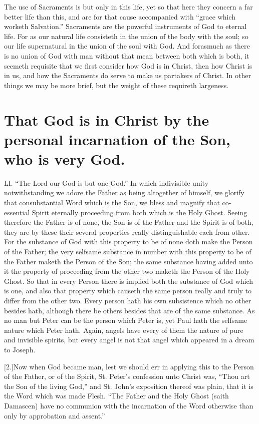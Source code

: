 The use of Sacraments is but only in this life, yet so that here they concern a far better life than this, and are for that cause accompanied with “grace which worketh Salvation.” Sacraments are the powerful instruments of God to eternal life. For as our natural life consisteth in the union of the body with the soul; so our life supernatural in the union of the soul with God. And forasmuch as there is no union of God with man without that mean between both which is both, it seemeth requisite that we first consider how God is in Christ, then how Christ is in us, and how the Sacraments do serve to make us partakers of Christ. In other things we may be more brief, but the weight of these requireth largeness.


\section*{That God is in Christ by the personal incarnation of the Son, who is very God.}
LI. “The Lord our God is but one God.” In which indivisible unity notwithstanding we adore the Father as being altogether of himself, we glorify that consubstantial Word which is the Son, we bless and magnify that co-essential Spirit eternally proceeding from both which is the Holy Ghost. Seeing therefore the Father is of none, the Son is of the Father and the Spirit is of both, they are by these their several properties really distinguishable each from other. For the substance of God with this property to be of none doth make the Person of the Father; the very selfsame substance in number with this property to be of the Father maketh the Person of the Son; the same substance having added unto it the property of proceeding from the other two maketh the Person of the Holy Ghost. So that in every Person there is implied both the substance of God which is one, and  also that property which causeth the same person really and truly to differ from the other two.
 Every person hath his own subsistence which no other besides hath, although there be others besides that are of the same substance. As no man but Peter can be the person which Peter is, yet Paul hath the selfsame nature which Peter hath. Again, angels have every of them the nature of pure and invisible spirits, but every angel is not that angel which appeared in a dream to Joseph.

[2.]Now when God became man, lest we should err in applying this to the Person of the Father, or of the Spirit, St. Peter’s confession unto Christ was, “Thou art the Son of the living God,” and St. John’s exposition thereof was plain, that it is the Word which was made Flesh. “The Father and the Holy Ghost (saith Damascen) have no communion with the incarnation of the Word otherwise than only by approbation and assent.”

